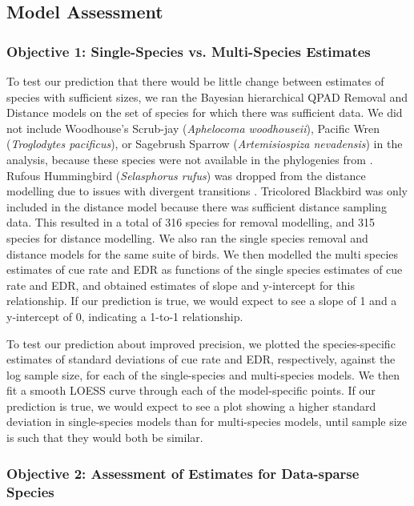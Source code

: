 \documentclass[12pt]{article}
\begin{document}
\subsection{Model Assessment}
\subsubsection{Objective 1: Single-Species vs. Multi-Species Estimates}
\par To test our prediction that there would be little change between estimates of species with sufficient sizes, we ran the Bayesian hierarchical QPAD Removal and Distance models on the set of species for which there was sufficient data.
We did not include Woodhouse's Scrub-jay (\textit{Aphelocoma woodhouseii}), Pacific Wren (\textit{Troglodytes pacificus}), or Sagebrush Sparrow (\textit{Artemisiospiza nevadensis}) in the analysis, because these species were not available in the phylogenies from \citet{jetz_global_2012}.
Rufous Hummingbird (\textit{Selasphorus rufus}) was dropped from the distance modelling due to issues with divergent transitions \citep{betancourt_diagnosing_2016, leimkuhler_simulating_2005}.
Tricolored Blackbird was only included in the distance model because there was sufficient distance sampling data.
This resulted in a total of 316 species for removal modelling, and 315 species for distance modelling.
We also ran the single species removal and distance models for the same suite of birds.
We then modelled the multi species estimates of cue rate and EDR as functions of the single species estimates of cue rate and EDR, and obtained estimates of slope and y-intercept for this relationship.
If our prediction is true, we would expect to see a slope of 1 and a y-intercept of 0, indicating a 1-to-1 relationship.

\par To test our prediction about improved precision, we plotted the species-specific estimates of standard deviations of cue rate and EDR, respectively, against the log sample size, for each of the single-species and multi-species models.
We then fit a smooth LOESS curve through each of the model-specific points.
If our prediction is true, we would expect to see a plot showing a higher standard deviation in single-species models than for multi-species models, until sample size is such that they would both be similar.

\subsubsection{Objective 2: Assessment of Estimates for Data-sparse Species}
\end{document}
